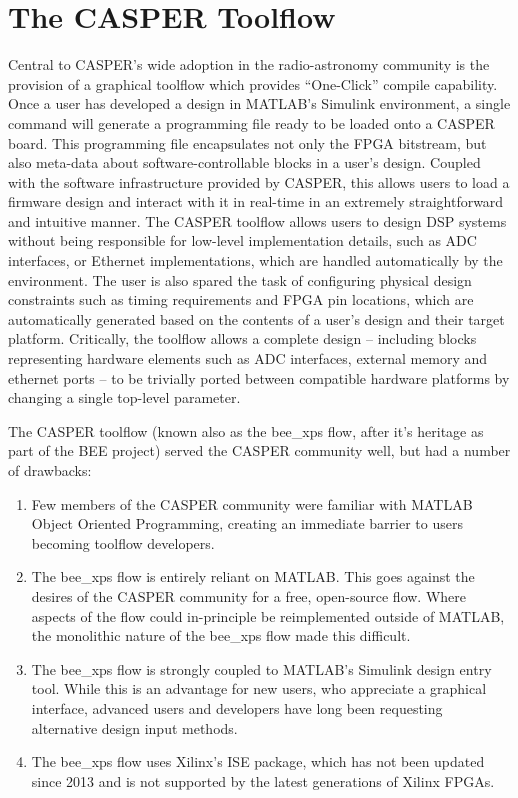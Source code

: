\documentclass{ws-jai}
\begin{document}
\section{The CASPER Toolflow} \label{sec:toolflow}

Central to CASPER's wide adoption in the radio-astronomy community is the provision of a graphical toolflow which provides ``One-Click'' compile capability. Once a user has developed a design in MATLAB's Simulink environment, a single command will generate a programming file ready to be loaded onto a CASPER board. This programming file encapsulates not only the FPGA bitstream, but also meta-data about software-controllable blocks in a user's design. Coupled with the software infrastructure provided by CASPER, this allows users to load a firmware design and interact with it in real-time in an extremely straightforward and intuitive manner.
The CASPER toolflow allows users to design DSP systems without being responsible for low-level implementation details, such as ADC interfaces, or Ethernet implementations, which are handled automatically by the environment. The user is also spared the task of configuring physical design constraints such as timing requirements and FPGA pin locations, which are automatically generated based on the contents of a user's design and their target platform. Critically, the toolflow allows a complete design -- including blocks representing hardware elements such as ADC interfaces, external memory and ethernet ports -- to be trivially ported between compatible hardware platforms by changing a single top-level parameter.

The CASPER toolflow (known also as the bee\_xps flow, after it's heritage as part of the BEE project) served the CASPER community well, but had a number of drawbacks:
\begin{enumerate}
 \item Few members of the CASPER community were familiar with MATLAB Object Oriented Programming, creating an immediate barrier to users becoming toolflow developers.
 \item The bee\_xps flow is entirely reliant on MATLAB. This goes against the desires of the CASPER community for a free, open-source flow. Where aspects of the flow could in-principle be reimplemented outside of MATLAB, the monolithic nature of the bee\_xps flow made this difficult.
 \item The bee\_xps flow is strongly coupled to MATLAB's Simulink design entry tool. While this is an advantage for new users, who appreciate a graphical interface, advanced users and developers have long been requesting alternative design input methods.
 \item The bee\_xps flow uses Xilinx's ISE package, which has not been updated since 2013 and is not supported by the latest generations of Xilinx FPGAs.
\end{enumerate}
\end{document}
